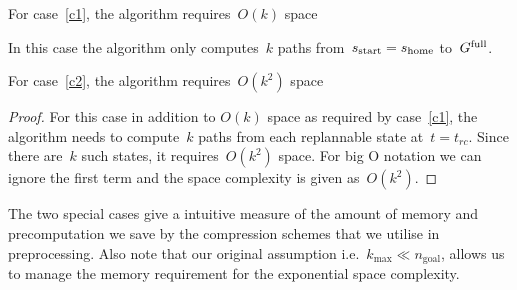 \documentclass[a4paper]{report}
\begin{document}
\vspace{2mm}
\begin{lemma}
	For case~\ref{c1}, the algorithm requires~$O(k)$ space
\end{lemma}
In this case the algorithm only computes~$k$ paths from~$s_{\text{start}} = s_{\textrm{home}}$ to~$G^{\textrm{full}}$.

\vspace{2mm}
\begin{lemma}
	For case~\ref{c2}, the algorithm requires~$O(k^2)$ space
\end{lemma}
\begin{proof}
	For this case in addition to $O(k)$ space as required by case~\ref{c1}, the algorithm needs to compute~$k$ paths from each replannable state at~$t=t_{rc}$. Since there are~$k$ such states, it requires~$O(k^2)$ space. For big O notation we can ignore the first term and the space complexity is given as~$O(k^2)$.
\end{proof}

The two special cases give a intuitive measure of the amount of memory and precomputation we save by the compression schemes that we utilise in preprocessing. Also note that our original assumption i.e.~$k_{\text{max}} \ll n_{\text{goal}}$, allows us to manage the memory requirement for the exponential space complexity.  
\end{document}
